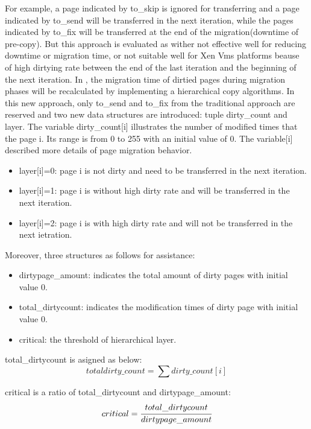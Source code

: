\documentclass[runningheads]{llncs}
\begin{document}
For example, a page indicated by to\_skip is ignored for transferring and a page indicated by to\_send   will be transferred in the next iteration, while the pages indicated by to\_fix will be transferred at the end of the migration(downtime of pre-copy). But this approach is evaluated as wither not effective well for reducing downtime or migration time, or not suitable well for Xen Vms platforms beause of high dirtying rate between the end of the last iteration and the beginning of the next iteration\cite{liu2010hierarchical}. In \cite{liu2010hierarchical}, the migration time of dirtied pages during migration phases will be recalculated by implementing a hierarchical copy algorithms. In this new approach, only to\_send and to\_fix from the traditional approach are reserved and two new data structures are introduced: tuple dirty\_count and layer. The variable dirty\_count[i] illustrates the number of modified times that the page i. Its range is from 0 to 255 with an initial value of 0. The variable[i] described more details of page migration behavior.

\begin{itemize}
\item layer[i]=0: page i is not dirty and need to be transferred in the next iteration.
\item layer[i]=1: page i is without high dirty rate and will be transferred in the next iteration.
\item layer[i]=2: page i is with high dirty rate and will not be transferred in the next ietration.
\end{itemize}

Moreover, three structures as follows for assistance:

\begin{itemize}
\item dirtypage\_amount: indicates the total amount of dirty pages with initial value 0.
\item total\_dirtycount: indicates the modification times of dirty page with initial value 0.
\item critical: the threshold of hierarchical layer.
\end{itemize}

total\_dirtycount is asigned as below:
\begin{equation}
totaldirty\_count=\sum dirty\_count[i]
\end{equation}

critical is a ratio of total\_dirtycount and dirtypage\_amount:
\begin{equation}
critical=\cfrac{total\_dirtycount}{dirtypage\_amount}
\end{equation}
\end{document}
